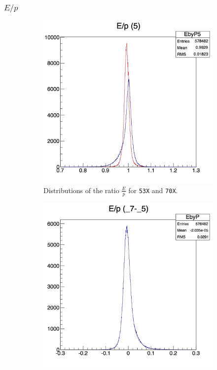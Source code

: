 \documentclass[10pt]{article}
\begin{document}
\subsubsection{$E/p$}
\begin{figure}[h!]
        \centering
        \begin{subfigure}[b]{0.4\textwidth}
                \includegraphics[width=\textwidth]{Plots/EbyPdist}
                \caption{Distributions of the ratio $\frac{E}{p}$ for \texttt{53X} and \texttt{70X}.}
                \label{EpDist}
        \end{subfigure}
        \begin{subfigure}[b]{0.4\textwidth}
                \includegraphics[width=\textwidth]{Plots/EbyP}

\end{subfigure}
\end{figure}
\end{document}
